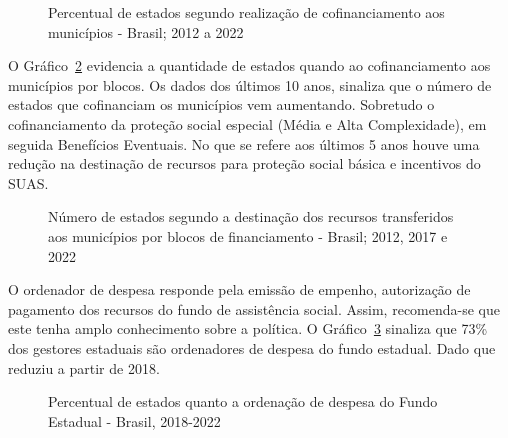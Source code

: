 \documentclass[
  letterpaper,
  DIV=11,
  numbers=noendperiod]{scrreprt}
\begin{document}
\begin{figure}


\caption{\label{fig-estados-cofinanciamento-municipios}Percentual de
estados segundo realização de cofinanciamento aos municípios - Brasil;
2012 a 2022}

\end{figure}%

O Gráfico~\ref{fig-estados-blocos-recursos} evidencia a quantidade de
estados quando ao cofinanciamento aos municípios por blocos. Os dados
dos últimos 10 anos, sinaliza que o número de estados que cofinanciam os
municípios vem aumentando. Sobretudo o cofinanciamento da proteção
social especial (Média e Alta Complexidade), em seguida Benefícios
Eventuais. No que se refere aos últimos 5 anos houve uma redução na
destinação de recursos para proteção social básica e incentivos do SUAS.

\begin{figure}


\caption{\label{fig-estados-blocos-recursos}Número de estados segundo a
destinação dos recursos transferidos aos municípios por blocos de
financiamento - Brasil; 2012, 2017 e 2022}

\end{figure}%

O ordenador de despesa responde pela emissão de empenho, autorização de
pagamento dos recursos do fundo de assistência social. Assim,
recomenda-se que este tenha amplo conhecimento sobre a política. O
Gráfico~\ref{fig-estado_ord_despesa} sinaliza que 73\% dos gestores
estaduais são ordenadores de despesa do fundo estadual. Dado que reduziu
a partir de 2018.

\begin{figure}


\caption{\label{fig-estado_ord_despesa}Percentual de estados quanto a
ordenação de despesa do Fundo Estadual - Brasil, 2018-2022}

\end{figure}%
\end{document}
